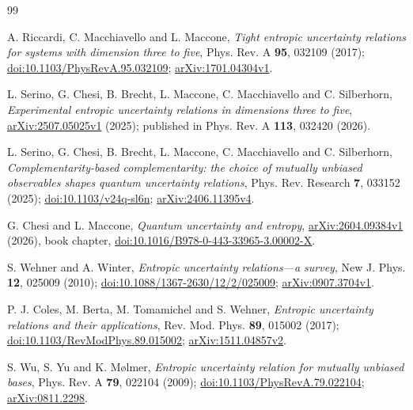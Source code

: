 \documentclass[11pt,a4paper]{article}
\theoremstyle{plain}
\begin{document}
\begin{thebibliography}{99}

A. Riccardi, C. Macchiavello and L. Maccone,
\emph{Tight entropic uncertainty relations for systems with dimension three to five},
Phys. Rev. A \textbf{95}, 032109 (2017);
\href{https://doi.org/10.1103/PhysRevA.95.032109}{doi:10.1103/PhysRevA.95.032109};
\href{https://arxiv.org/abs/1701.04304v1}{arXiv:1701.04304v1}.

L. Serino, G. Chesi, B. Brecht, L. Maccone, C. Macchiavello and C. Silberhorn,
\emph{Experimental entropic uncertainty relations in dimensions three to five},
\href{https://arxiv.org/abs/2507.05025v1}{arXiv:2507.05025v1} (2025);
published in Phys. Rev. A \textbf{113}, 032420 (2026).

L. Serino, G. Chesi, B. Brecht, L. Maccone, C. Macchiavello and C. Silberhorn,
\emph{Complementarity-based complementarity: the choice of mutually unbiased
observables shapes quantum uncertainty relations},
Phys. Rev. Research \textbf{7}, 033152 (2025);
\href{https://doi.org/10.1103/v24q-sl6n}{doi:10.1103/v24q-sl6n};
\href{https://arxiv.org/abs/2406.11395v4}{arXiv:2406.11395v4}.

G. Chesi and L. Maccone,
\emph{Quantum uncertainty and entropy},
\href{https://arxiv.org/abs/2604.09384v1}{arXiv:2604.09384v1} (2026), book chapter,
\href{https://doi.org/10.1016/B978-0-443-33965-3.00002-X}{doi:10.1016/B978-0-443-33965-3.00002-X}.

S. Wehner and A. Winter,
\emph{Entropic uncertainty relations---a survey},
New J. Phys. \textbf{12}, 025009 (2010);
\href{https://doi.org/10.1088/1367-2630/12/2/025009}{doi:10.1088/1367-2630/12/2/025009};
\href{https://arxiv.org/abs/0907.3704v1}{arXiv:0907.3704v1}.

P. J. Coles, M. Berta, M. Tomamichel and S. Wehner,
\emph{Entropic uncertainty relations and their applications},
Rev. Mod. Phys. \textbf{89}, 015002 (2017);
\href{https://doi.org/10.1103/RevModPhys.89.015002}{doi:10.1103/RevModPhys.89.015002};
\href{https://arxiv.org/abs/1511.04857v2}{arXiv:1511.04857v2}.

S. Wu, S. Yu and K. M{\o}lmer,
\emph{Entropic uncertainty relation for mutually unbiased bases},
Phys. Rev. A \textbf{79}, 022104 (2009);
\href{https://doi.org/10.1103/PhysRevA.79.022104}{doi:10.1103/PhysRevA.79.022104};
\href{https://arxiv.org/abs/0811.2298}{arXiv:0811.2298}.


\end{thebibliography}
\end{document}
